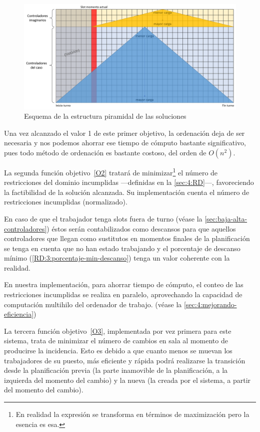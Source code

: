 \begin{figure}
	\centering
	\includegraphics[width=\linewidth]{capitulos/Capitulo3-Metodologia-propuesta/recursos/estructura-piramidal}
	\caption{Esquema de la estructura piramidal de las soluciones}
	\label{fig:3:estructura-piramidal}
\end{figure}

Una vez alcanzado el valor 1 de este primer objetivo, la ordenación deja de ser necesaria y nos podemos ahorrar ese tiempo de cómputo bastante significativo, pues todo método de ordenación es bastante costoso, del orden de $O(n^2)$.

La segunda función objetivo~\ref{O2} tratará de minimizar\footnote{En realidad la expresión se transforma en términos de maximización pero la esencia es esa.} el número de restricciones del dominio incumplidas ---definidas en la \autoref{sec:4:RD}---, favoreciendo la factibilidad de la solución alcanzada. Su implementación cuenta el número de restricciones incumplidas (normalizado).

En caso de que el trabajador tenga slots fuera de turno (véase la \autoref{sec:baja-alta-controladores}) éstos serán contabilizados como descansos para que aquellos controladores que llegan como sustitutos en momentos finales de la planificación se tenga en cuenta que no han estado trabajando y el porcentaje de descanso mínimo (\ref{RD:3:porcentaje-min-descanso}) tenga un valor coherente con la realidad.

En nuestra implementación, para ahorrar tiempo de cómputo, el conteo de las restricciones incumplidas se realiza en paralelo, aprovechando la capacidad de computación multihilo del ordenador de trabajo. (véase la \autoref{sec:4:mejorando-eficiencia})

La tercera función objetivo~\ref{O3}, implementada por vez primera para este sistema, trata de minimizar el número de cambios en sala al momento de producirse la incidencia. Esto es debido a que cuanto menos se muevan los trabajadores de su puesto, más eficiente y rápida podrá realizarse la transición desde la planificación previa (la parte inamovible de la planificación, a la izquierda del momento del cambio) y la nueva (la creada por el sistema, a partir del momento del cambio).

